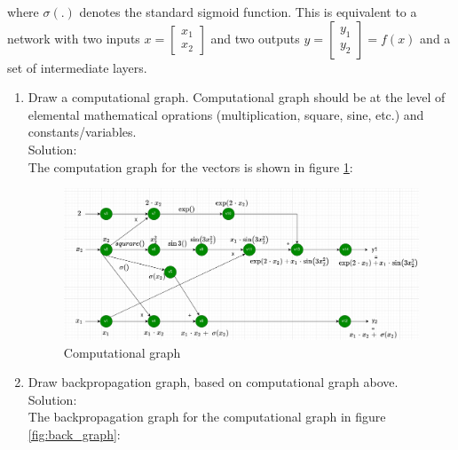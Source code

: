\documentclass[12pt]{article}
\begin{document}
\noindent where $\sigma(.)$ denotes the standard sigmoid function. This is equivalent to a network with two inputs 
$x = 
\begin{bmatrix}
x_1\\
x_2
\end{bmatrix}
$
and two outputs 
$y = 
\begin{bmatrix}
y_1\\
y_2
\end{bmatrix} = f(x)
$
and a set of intermediate layers.

\begin{enumerate}[label=(\roman*)]

\newpage
\item Draw a computational graph. Computational graph should be at the level of elemental mathematical oprations (multiplication, square, sine, etc.) and constants/variables.\\


Solution:\\
The computation graph for the vectors is shown in figure \ref{fig:comp_graph}:

\begin{figure}[h!]
    \centering
    \includegraphics[width=\textwidth, scale=0.5]{images/Screenshot_2021-04-07 A2_571T drawio - diagrams net.png}
    \caption{Computational graph}
    \label{fig:comp_graph}
\end{figure}


\newpage

\item Draw backpropagation graph, based on computational graph above.\\

Solution:\\
The backpropagation graph for the computational graph in figure \ref{fig:back_graph}:


\end{enumerate}
\end{document}
